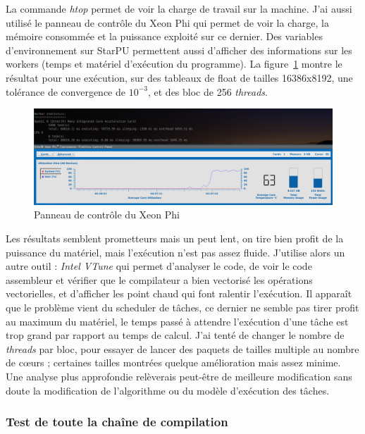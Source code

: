 La commande \emph{htop} permet de voir la charge de travail sur la machine. J'ai
aussi utilisé le panneau de contrôle du Xeon Phi qui permet de voir la charge,
la mémoire consommée et la puissance exploité sur ce dernier. Des variables
d'environnement sur StarPU permettent aussi d'afficher des informations sur les
workers (temps et matériel d'exécution du programme). La figure~\ref{micsmc_gui}
montre le résultat pour une exécution, sur des tableaux de float de tailles
16386x8192, une tolérance de convergence de $10^{-3}$, et des bloc de 256
\emph{threads}.

\begin{figure}[h]
   \begin{center}
      \includegraphics[scale=0.25]{./images/micsmc_gui.png}
   \end{center}
   \caption{Panneau de contrôle du Xeon Phi}
   \label{micsmc_gui}
\end{figure}

Les résultats semblent prometteurs mais un peut lent, on tire bien profit de la
puissance du matériel, mais l'exécution n'est pas assez fluide. J'utilise alors
un autre outil : \emph{Intel VTune} qui permet d'analyser le code, de voir le
code assembleur et vérifier que le compilateur a bien vectorisé les opérations
vectorielles, et d'afficher les point chaud qui font ralentir l'exécution. Il
apparaît que le problème vient du scheduler de tâches, ce dernier ne semble pas
tirer profit au maximum du matériel, le temps passé à attendre l'exécution
d'une tâche est trop grand par rapport au temps de calcul. J'ai tenté de changer
le nombre de \emph{threads} par bloc, pour essayer de lancer des paquets de
tailles multiple au nombre de c\oe{}urs ; certaines tailles montrées quelque
amélioration mais assez minime. Une analyse plus approfondie relèverais
peut-être de meilleure modification sans doute la modification de l'algorithme
ou du modèle d'exécution des tâches.

\subsubsection{Test de toute la chaîne de compilation}
